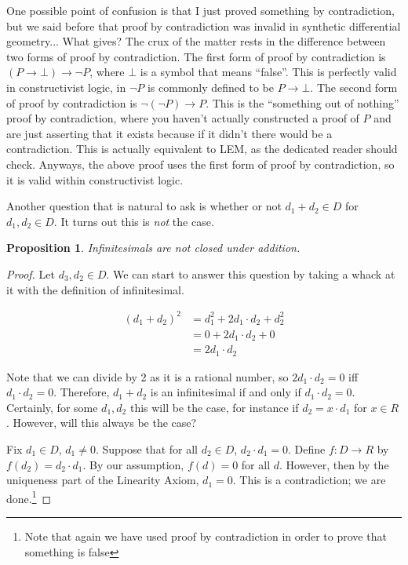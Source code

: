 \documentclass[]{book}
\newtheorem{prop}[thm]{Proposition}
\begin{document}
One possible point of confusion is that I just proved something by contradiction, but we said before that proof by contradiction was invalid in synthetic differential geometry... What gives? The crux of the matter rests in the difference between two forms of proof by contradiction. The first form of proof by contradiction is $(P \to \bot) \to \neg P$, where $\bot$ is a symbol that means ``false''. This is perfectly valid in constructivist logic, in $\neg P$ is commonly defined to be $P \to \bot$. The second form of proof by contradiction is $\neg(\neg P) \to P$. This is the ``something out of nothing'' proof by contradiction, where you haven't actually constructed a proof of $P$ and are just asserting that it exists because if it didn't there would be a contradiction. This is actually equivalent to LEM, as the dedicated reader should check. Anyways, the above proof uses the first form of proof by contradiction, so it is valid within constructivist logic.

Another question that is natural to ask is whether or not $d_1 + d_2 \in D$ for $d_1, d_2 \in D$. It turns out this is \emph{not} the case.

\begin{prop}
  Infinitesimals are not closed under addition.
\end{prop}
\begin{proof}
  Let $d_3, d_2 \in D$. We can start to answer this question by taking a whack at it with the definition of infinitesimal.

  \begin{align*}
    (d_1 + d_2)^2 &= d_1^2 + 2d_1 \cdot d_2 + d_2^2 \\
                  &= 0 + 2d_1 \cdot d_2 + 0 \\
                  &= 2d_1 \cdot d_2
  \end{align*}

  Note that we can divide by 2 as it is a rational number, so $2d_1 \cdot d_2 = 0$ iff $d_1 \cdot d_2 = 0$. Therefore, $d_1 + d_2$ is an infinitesimal if and only if $d_1 \cdot d_2 = 0$. Certainly, for some $d_1,d_2$ this will be the case, for instance if $d_2 = x \cdot d_1$ for $x \in R$. However, will this always be the case?

  Fix $d_1 \in D$, $d_1 \neq 0$. Suppose that for all $d_2 \in D$, $d_2 \cdot d_1 = 0$. Define $f : D \to R$ by $f(d_2) = d_2 \cdot d_1$. By our assumption, $f(d) = 0$ for all $d$. However, then by the uniqueness part of the Linearity Axiom, $d_1 = 0$. This is a contradiction; we are done.\footnote{Note that again we have used proof by contradiction in order to prove that something is false}
\end{proof}
\end{document}
